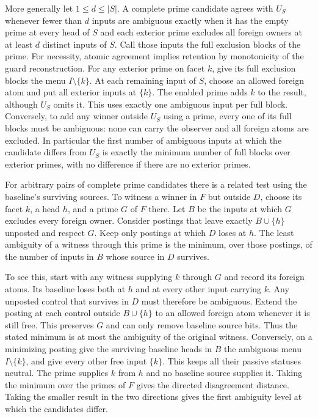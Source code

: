 More generally let $1\le d\le |S|$. A complete prime candidate
agrees with $U_S$ whenever fewer than $d$ inputs are ambiguous
exactly when it has the empty prime at every head of $S$ and
each exterior prime excludes all foreign owners at at least
$d$ distinct inputs of $S$. Call those inputs the full
exclusion blocks of the prime. For necessity, atomic agreement
implies retention by monotonicity of the guard reconstruction.
For any exterior prime on facet $k$, give its full exclusion
blocks the menu $I\setminus\{k\}$. At each remaining input of
$S$, choose an allowed foreign atom and put all exterior inputs
at $\{k\}$. The enabled prime adds $k$ to the result, although
$U_S$ omits it. This uses exactly one ambiguous input per full
block. Conversely, to add any winner outside $U_S$ using a
prime, every one of its full blocks must be ambiguous: none
can carry the observer and all foreign atoms are excluded.
In particular the first number of ambiguous inputs at which
the candidate differs from $U_S$ is exactly the minimum number
of full blocks over exterior primes, with no difference if
there are no exterior primes.

For arbitrary pairs of complete prime candidates there is a
related test using the baseline's surviving sources. To witness
a winner in $F$ but outside $D$, choose its facet $k$, a head
$h$, and a prime $G$ of $F$ there. Let $B$ be the inputs at
which $G$ excludes every foreign owner. Consider postings
that leave exactly $B\cup\{h\}$ unposted and respect $G$.
Keep only postings at which $D$ loses at $h$. The least
ambiguity of a witness through this prime is the minimum,
over those postings, of the number of inputs in $B$ whose
source in $D$ survives.

To see this, start with any witness supplying $k$ through
$G$ and record its foreign atoms. Its baseline loses both
at $h$ and at every other input carrying $k$. Any unposted
control that survives in $D$ must therefore be ambiguous.
Extend the posting at each control outside $B\cup\{h\}$
to an allowed foreign atom whenever it is still free.
This preserves $G$ and can only remove baseline source
bits. Thus the stated minimum is at most the ambiguity of
the original witness. Conversely, on a minimizing posting
give the surviving baseline heads in $B$ the ambiguous menu
$I\setminus\{k\}$, and give every other free input $\{k\}$.
This keeps all their passive statuses neutral. The prime
supplies $k$ from $h$ and no baseline source supplies it.
Taking the minimum over the primes of $F$ gives the directed
disagreement distance. Taking the smaller result in the
two directions gives the first ambiguity level at which the
candidates differ.

